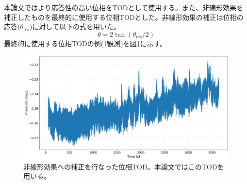 本論文ではより応答性の高い位相をTODとして使用する。また、非線形効果を補正したものを最終的に使用する位相TODとした。非線形効果の補正は位相の応答($\theta_{\mathrm{res}}$)に対して以下の式\cite{sueno_doctor}を用いた。
\begin{equation}
  \theta = 2\tan(\theta_{\mathrm{res}}/2)
\end{equation}
最終的に使用する位相TODの例(1観測)を図\ref{raw_phase}に示す。
\begin{figure}[htbp]
  \centering
  \includegraphics[width=0.95\columnwidth]{5_alignment/figs/raw_phase_deg.png}
  \caption{非線形効果への補正を行なった位相TOD。本論文ではこのTODを用いる。}
  \label{raw_phase}
\end{figure}

